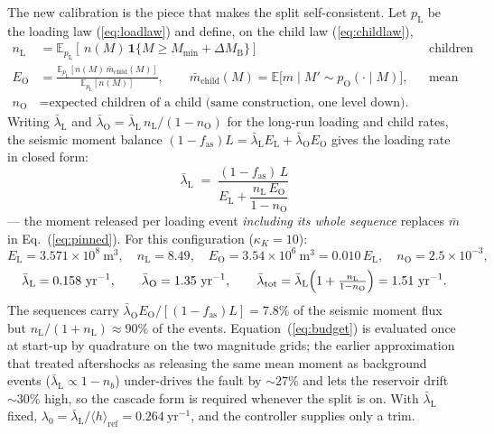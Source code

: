 \documentclass[11pt]{article}
\newcommand{\Mmin}{M_{\min}}
\newcommand{\dM}{\Delta M_{\mathrm{B}}}
\newcommand{\Ltot}{L}
\newcommand{\fas}{f_{\mathrm{as}}}
\newcommand{\EL}{E_{\mathrm{L}}}
\newcommand{\EO}{E_{\mathrm{O}}}
\newcommand{\nL}{n_{\mathrm{L}}}
\newcommand{\nO}{n_{\mathrm{O}}}
\begin{document}
The new calibration is the piece that makes the split self-consistent. Let
$p_{\mathrm{L}}$ be the loading law (\ref{eq:loadlaw}) and define, on the child law
(\ref{eq:childlaw}),
\begin{align}
  \nL &= \mathbb{E}_{p_{\mathrm{L}}}\!\left[\,n(M)\,\mathbf{1}\{M \ge \Mmin+\dM\}\right]
        && \text{children per loading event,} \nonumber\\[2pt]
  \EO &= \frac{\mathbb{E}_{p_{\mathrm{L}}}\!\left[n(M)\,\bar m_{\mathrm{child}}(M)\right]}
              {\mathbb{E}_{p_{\mathrm{L}}}\!\left[n(M)\right]},
        \qquad
        \bar m_{\mathrm{child}}(M) = \mathbb{E}\bigl[m \mid M' \sim p_{\mathrm{O}}(\cdot\mid M)\bigr],
        && \text{mean child moment,} \nonumber\\[2pt]
  \nO &= \text{expected children of a child (same construction, one level down).}
        &&
\label{eq:defs}
\end{align}
Writing $\bar\lambda_{\mathrm{L}}$ and $\bar\lambda_{\mathrm{O}} =
\bar\lambda_{\mathrm{L}}\,\nL/(1-\nO)$ for the long-run loading and child rates, the
seismic moment balance $(1-\fas)\Ltot = \bar\lambda_{\mathrm{L}}\EL +
\bar\lambda_{\mathrm{O}}\EO$ gives the loading rate in closed form:
\begin{equation}
  \boxed{\;
  \bar\lambda_{\mathrm{L}}
  \;=\;
  \frac{(1-\fas)\,\Ltot}{\EL + \dfrac{\nL\,\EO}{1-\nO}}
  \;}
\label{eq:budget}
\end{equation}
--- the moment released per loading event \emph{including its whole sequence} replaces
$\bar m$ in Eq.~(\ref{eq:pinned}). For this configuration ($\kappa_K = 10$):
\[
  \EL = 3.571\times10^{8}\ \mathrm{m^3},\quad
  \nL = 8.49,\quad
  \EO = 3.54\times10^{6}\ \mathrm{m^3} = 0.010\,\EL,\quad
  \nO = 2.5\times10^{-3},
\]
\[
  \bar\lambda_{\mathrm{L}} = 0.158\ \mathrm{yr^{-1}},\qquad
  \bar\lambda_{\mathrm{O}} = 1.35\ \mathrm{yr^{-1}},\qquad
  \bar\lambda_{\mathrm{tot}} = \bar\lambda_{\mathrm{L}}\Bigl(1 + \tfrac{\nL}{1-\nO}\Bigr)
  = 1.51\ \mathrm{yr^{-1}} .
\]
The sequences carry $\bar\lambda_{\mathrm{O}}\EO/[(1-\fas)\Ltot] = 7.8\%$ of the seismic
moment flux but $\nL/(1+\nL) \approx 90\%$ of the events. Equation~(\ref{eq:budget}) is
evaluated once at start-up by quadrature on the two magnitude grids; the earlier
approximation that treated aftershocks as releasing the same mean moment as background
events ($\bar\lambda_{\mathrm{L}} \propto 1-n_b$) under-drives the fault by
$\sim27\%$ and lets the reservoir drift $\sim30\%$ high, so the cascade form is required
whenever the split is on. With $\bar\lambda_{\mathrm{L}}$ fixed,
$\lambda_0 = \bar\lambda_{\mathrm{L}}/\langle h\rangle_{\mathrm{ref}} = 0.264\
\mathrm{yr^{-1}}$, and the controller supplies only a trim.
\end{document}
